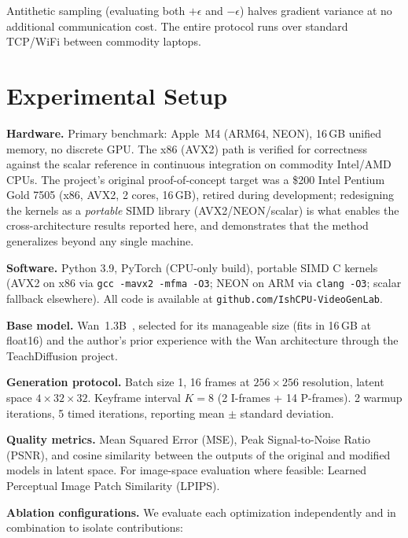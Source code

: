 \documentclass[11pt]{article}
\begin{document}
Antithetic sampling (evaluating both $+\epsilon$ and $-\epsilon$) halves gradient variance at no additional communication cost. The entire protocol runs over standard TCP/WiFi between commodity laptops.


\section{Experimental Setup}

\textbf{Hardware.} Primary benchmark: Apple~M4 (ARM64, NEON), 16\,GB unified memory, no discrete GPU. The x86 (AVX2) path is verified for correctness against the scalar reference in continuous integration on commodity Intel/AMD CPUs. The project's original proof-of-concept target was a \$200 Intel Pentium Gold 7505 (x86, AVX2, 2 cores, 16\,GB), retired during development; redesigning the kernels as a \emph{portable} SIMD library (AVX2/NEON/scalar) is what enables the cross-architecture results reported here, and demonstrates that the method generalizes beyond any single machine.

\textbf{Software.} Python 3.9, PyTorch (CPU-only build), portable SIMD C kernels (AVX2 on x86 via \texttt{gcc -mavx2 -mfma -O3}; NEON on ARM via \texttt{clang -O3}; scalar fallback elsewhere). All code is available at \texttt{github.com/IshCPU-VideoGenLab}.

\textbf{Base model.} Wan~1.3B~\citep{wan2024}, selected for its manageable size (fits in 16\,GB at float16) and the author's prior experience with the Wan architecture through the TeachDiffusion project.

\textbf{Generation protocol.} Batch size 1, 16 frames at $256 \times 256$ resolution, latent space $4 \times 32 \times 32$. Keyframe interval $K=8$ (2 I-frames + 14 P-frames). 2 warmup iterations, 5 timed iterations, reporting mean $\pm$ standard deviation.

\textbf{Quality metrics.} Mean Squared Error (MSE), Peak Signal-to-Noise Ratio (PSNR), and cosine similarity between the outputs of the original and modified models in latent space. For image-space evaluation where feasible: Learned Perceptual Image Patch Similarity (LPIPS).

\textbf{Ablation configurations.} We evaluate each optimization independently and in combination to isolate contributions:
\end{document}
